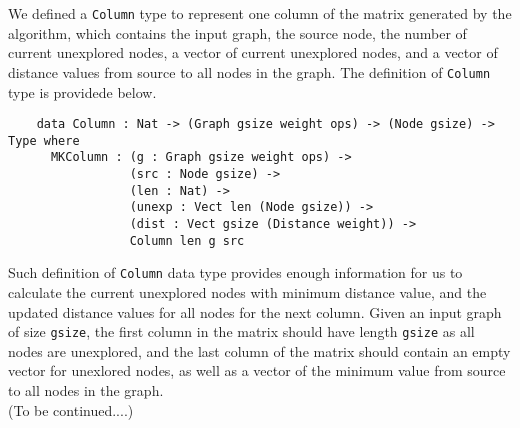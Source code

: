 We defined a \texttt{Column} type to represent one column of the matrix generated by the algorithm, which contains the input graph, the source node, the number of current unexplored nodes, a vector of current unexplored nodes, and a vector of distance values from source to all nodes in the graph. The definition of \texttt{Column} type is providede below. 
\\
\begin{lstlisting}
	data Column : Nat -> (Graph gsize weight ops) -> (Node gsize) -> Type where
	  MKColumn : (g : Graph gsize weight ops) ->
	             (src : Node gsize) ->
	             (len : Nat) ->
	             (unexp : Vect len (Node gsize)) ->
	             (dist : Vect gsize (Distance weight)) ->
	             Column len g src

\end{lstlisting}
Such definition of \texttt{Column} data type provides enough information for us to calculate the current unexplored nodes with minimum distance value, and the updated distance values for all nodes for the next column. Given an input graph of size \texttt{gsize}, the first column in the matrix should have length \texttt{gsize} as all nodes are unexplored, and the last column of the matrix should contain an empty vector for unexlored nodes, as well as a vector of the minimum value from source to all nodes in the graph. 
\\


(To be continued....)
